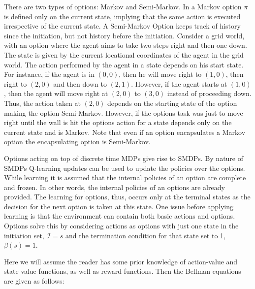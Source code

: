 There are two types of options: Markov and Semi-Markov. In a Markov option \(\pi\) is defined only on the current state, implying that the same action is executed irrespective of the current state. A Semi-Markov Option keeps track of history since the initiation, but not history before the initiation. Consider a grid world, with an option where the agent aims to take two steps right and then one down. The state is given by the current locational coordinates of the agent in the grid world. The action performed by the agent in a state depends on his start state. For instance, if the agent is in \((0,0)\), then he will move right to \((1,0)\), then right to \((2,0)\) and then down to \((2,1)\). However, if the agent starts at \((1,0)\), then the agent will move right at \((2,0)\) to \((3,0)\) instead of proceeding down. Thus, the action taken at \((2,0)\) depends on the starting state of the option making the option Semi-Markov. However, if the options task was just to move right until the wall is hit the options action for a state depends only on the current state and is Markov. Note that even if an option encapsulates a Markov option the encapsulating option is Semi-Markov.

Options acting on top of discrete time MDPs give rise to SMDPs. By nature of SMDPs Q-learning updates can be used to update the policies over the options. While learning it is assumed that the internal policies of an option are complete and frozen. In other words, the internal policies of an options are already provided. The learning for options, thus, occurs only at the terminal states as the decision for the next option is taken at this state. One issue before applying learning is that the environment can contain both basic actions and options. Options solve this by considering actions as options with just one state in the initiation set, \(\mathcal{I}=s\) and the termination condition for that state set to 1, \(\beta(s)=1\).

Here we will assume the reader has some prior knowledge of action-value and state-value functions, as well as reward functions. Then the Bellman equations are given as follows:

